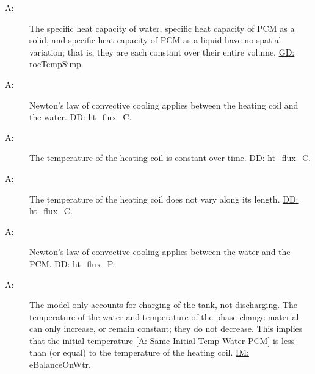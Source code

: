 \documentclass[12pt]{article}
\newcounter{assumpnum}
\newcommand{\atheassumpnum}{A\theassumpnum}
\begin{document}
\begin{description}
\item[\atheassumpnum\label{A:Specific-Heat-Energy-Constant-over-Volume}:]The specific heat capacity of water, specific heat capacity of PCM as a solid, and specific heat capacity of PCM as a liquid have no spatial variation; that is, they are each constant over their entire volume. \hyperref[GD:rocTempSimp]{GD: rocTempSimp}.
\end{description}
\begin{description}
\item[\atheassumpnum\label{A:Newton-Law-Convective-Cooling-Coil-Water}:]Newton's law of convective cooling applies between the heating coil and the water. \hyperref[DD:ht.flux.C]{DD: ht\_flux\_C}.
\end{description}
\begin{description}
\item[\atheassumpnum\label{A:Temp-Heating-Coil-Constant-over-Time}:]The temperature of the heating coil is constant over time. \hyperref[DD:ht.flux.C]{DD: ht\_flux\_C}.
\end{description}
\begin{description}
\item[\atheassumpnum\label{A:Temp-Heating-Coil-Constant-over-Length}:]The temperature of the heating coil does not vary along its length. \hyperref[DD:ht.flux.C]{DD: ht\_flux\_C}.
\end{description}
\begin{description}
\item[\atheassumpnum\label{A:Law-Convective-Cooling-Water-PCM}:]Newton's law of convective cooling applies between the water and the PCM. \hyperref[DD:ht.flux.P]{DD: ht\_flux\_P}.
\end{description}
\begin{description}
\item[\atheassumpnum\label{A:Charging-Tank-No-Temp-Discharge}:]The model only accounts for charging of the tank, not discharging. The temperature of the water and temperature of the phase change material can only increase, or remain constant; they do not decrease. This implies that the initial temperature {[}\hyperref[A:Same-Initial-Temp-Water-PCM]{A: Same-Initial-Temp-Water-PCM}{]} is less than (or equal) to the temperature of the heating coil. \hyperref[IM:eBalanceOnWtr]{IM: eBalanceOnWtr}.
\end{description}
\end{document}
